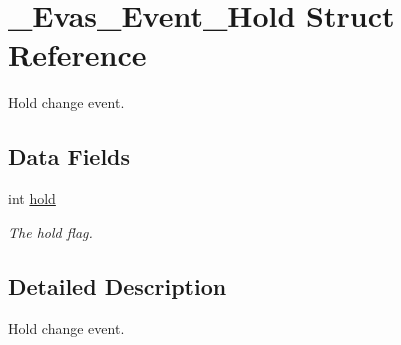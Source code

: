 \section{\_\-Evas\_\-Event\_\-Hold Struct Reference}
\label{struct__Evas__Event__Hold}


Hold change event.  


\subsection*{Data Fields}
\begin{DoxyCompactItemize}
\item 
int \hyperlink{struct__Evas__Event__Hold_a21f7238382ebd994e083623f777853f3}{hold}\label{struct__Evas__Event__Hold_a21f7238382ebd994e083623f777853f3}

\begin{DoxyCompactList}\small\item\em The hold flag. \item\end{DoxyCompactList}\end{DoxyCompactItemize}


\subsection{Detailed Description}
Hold change event. 